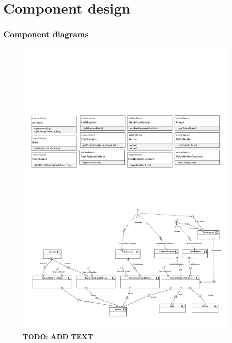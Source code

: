 \section{Component design}
\subsubsection{Component diagrams}
\begin{figure}
\centerline{\includegraphics[width=\textwidth]{img/component_diagrams/ComponentDiagram_TollLane_components}}
\caption{\textbf{TODO: ADD TEXT}}
\label{fig:cd_tlc}
\end{figure}

